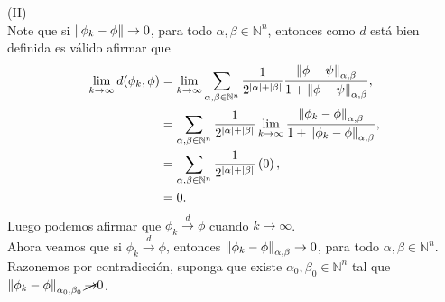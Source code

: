 \begin{homeworkProblem}
\begin{solution}
    (II)\\
    Note que si $\left\|\phi_{k}-\phi\right\|\to 0$, para todo $\alpha,\beta\in\mathbb{N}^{n}$, entonces como $d$ está bien definida es válido afirmar que
    \begin{align*}
      \lim_{k \to \infty}d(\phi_{k},\phi)&=\lim_{k \to \infty}\sum_{\alpha,\beta\in\mathbb{N}^{n}}\frac{1}{2^{|\alpha|+|\beta|}}\frac{\left\|\phi-\psi\right\|_{\alpha,\beta}}{1+\left\|\phi-\psi\right\|_{\alpha,\beta}},\\
      &=\sum_{\alpha,\beta\in\mathbb{N}^{n}}\frac{1}{2^{|\alpha|+|\beta|}}\lim_{k \to \infty}\frac{\left\|\phi_{k}-\phi\right\|_{\alpha,\beta}}{1+\left\|\phi_{k}-\phi\right\|_{\alpha,\beta}},\\
      &=\sum_{\alpha,\beta\in\mathbb{N}^{n}}\frac{1}{2^{|\alpha|+|\beta|}}\left( 0 \right),\\
      &=0.
    \end{align*}
    Luego podemos afirmar que $\phi_{k}\overset{d}{\to}\phi$ cuando $k\to\infty$.\\
    Ahora veamos que si $\phi_{k}\overset{d}{\to}\phi$, entonces $\left\|\phi_{k}-\phi\right\|_{\alpha,\beta}\to 0$, para todo $\alpha,\beta\in\mathbb{N}^{n}$.\\
    Razonemos por contradicción, suponga que existe $\alpha_{0},\beta_{0}\in\mathbb{N}^{n}$ tal que $\left\|\phi_{k}-\phi\right\|_{\alpha_{0},\beta_{0}}\cancel{\to} 0$. 
  \end{solution}
\end{homeworkProblem}
